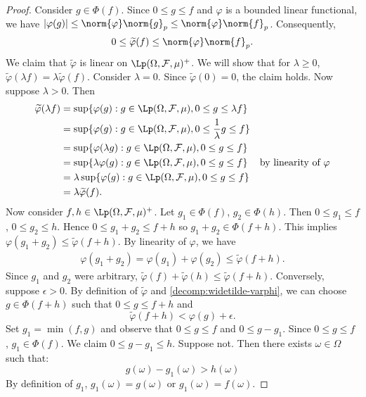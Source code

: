 \begin{proof}
Consider $g \in \Phi(f)$. Since $0 \leq g \leq f$ and $\varphi$ is a bounded linear functional, we have $| \varphi(g) | \leq \norm{ \varphi } \norm{g}_p \leq \norm{ \varphi } \norm{f}_p$. Consequently, 
\begin{equation}
    \label{decomp:widetilde-varphi}
    0 \leq \widetilde{\varphi}(f) \leq \norm{ \varphi } \norm{f}_p.
\end{equation}
We claim that $\widetilde{\varphi}$ is linear on $\Lp(\Omega, \mathcal{F}, \mu)^+$.
We will show that for $\lambda \geq 0$, $\widetilde{\varphi}(\lambda f) = \lambda \widetilde{\varphi}(f)$. Consider $\lambda = 0$. Since $\widetilde{\varphi}(0) = 0$, the claim holds.
Now suppose $\lambda > 0$. Then
\begin{align*}
    \widetilde{\varphi}(\lambda f) &= \sup \{ \varphi(g) : g \in \Lp(\Omega, \mathcal{F}, \mu), 0 \leq g \leq \lambda f \} & \\
    &= \sup \{ \varphi(g) : g \in \Lp(\Omega, \mathcal{F}, \mu), 0 \leq \frac{1}{\lambda} g \leq f \}  & \\
    &= \sup \{ \varphi(\lambda g) : g \in \Lp(\Omega, \mathcal{F}, \mu), 0 \leq g \leq f \} & \\
    &= \sup \{ \lambda \varphi( g) : g \in \Lp(\Omega, \mathcal{F}, \mu), 0 \leq g \leq f \} & \text{by linearity of $\varphi$} \\
    &= \lambda \sup \{  \varphi( g) : g \in \Lp(\Omega, \mathcal{F}, \mu), 0 \leq g \leq f \} & \\
    &= \lambda \widetilde{\varphi}(f).
\end{align*}
Now consider $f, h \in \Lp(\Omega, \mathcal{F}, \mu)^+$. Let $g_1 \in \Phi(f)$, $g_2 \in \Phi(h)$.
Then $0 \leq g_1 \leq f$, $0 \leq g_2 \leq h$. Hence $0 \leq g_1 + g_2 \leq f + h$ so $g_1 + g_2 \in \Phi(f + h)$. This implies $\varphi(g_1 + g_2) \leq \widetilde{\varphi} (f + h)$.  
By linearity of $\varphi$, we have
\begin{align*}
    \varphi(g_1 + g_2) = \varphi(g_1) + \varphi(g_2) \leq \widetilde{\varphi} (f + h).
\end{align*}
Since $g_1$ and $g_2$ were arbitrary, $ \widetilde{\varphi} (f) + \widetilde{\varphi} (h) \leq \widetilde{\varphi} (f + h)$. Conversely, suppose $\epsilon > 0$. By definition of $\widetilde{\varphi}$ and \ref{decomp:widetilde-varphi}, we can choose $g \in \Phi(f + h)$ such that $0 \leq g \leq f + h$ and 
\begin{equation}
    \label{decomp:prop}
    \widetilde{\varphi} (f + h) < \varphi(g) + \epsilon.
\end{equation}
Set $g_1 = \min(f, g)$ and observe that $0 \leq g \leq f$ and $0 \leq g - g_1$. Since $0 \leq g \leq f$ , $g_1 \in \Phi(f)$.
We claim $0 \leq g - g_1 \leq h$. Suppose not. Then there exists $\omega \in \Omega$ such that:
\begin{equation}
    \label{decomp:contradict}
    g(\omega) - g_1(\omega) > h (\omega)
\end{equation}
By definition of $g_1$, $g_1(\omega) = g(\omega)$ or $g_1(\omega) = f(\omega)$.


\end{proof}
